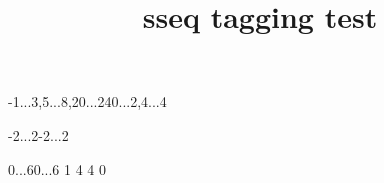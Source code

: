 \documentclass{article}
\title{sseq tagging test}
\begin{document}
\begin{sseq}{-1...3,5...8,20...24}{0...2,4...4}
\end{sseq}

\begin{sseq}[grid=chess,labelstep=1,
entrysize=.8cm]{-2...2}{-2...2}
\ssdropbull
\end{sseq}

\begin{sseq}{0...6}{0...6}
\ssdropbull
{}
 1
\ssdrop{\clubsuit}
\ssdropextension
\ssdropextension
\ssdropextension
{}
 4
 4
\ssdropboxed{\spadesuit}
 0
\ssdropbull
\end{sseq}
\end{document}
